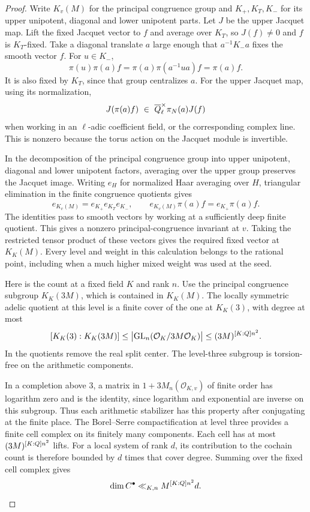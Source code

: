 \begin{proof}
Write \(K_v(M)\) for the principal congruence group and
\(K_+,K_T,K_-\) for its upper unipotent, diagonal and lower
unipotent parts. Let \(J\) be the upper Jacquet map. Lift the
fixed Jacquet vector to \(f\) and average over \(K_T\), so
\(J(f)\ne0\) and \(f\) is \(K_T\)-fixed. Take a diagonal translate \(a\) large enough that \(a^{-1}K_-a\) fixes the smooth vector \(f\). For \(u\in K_-\),
\[
 \pi(u)\pi(a)f=\pi(a)\pi(a^{-1}ua)f=\pi(a)f.
\]
It is also fixed by \(K_T\), since that group centralizes \(a\).
For the upper Jacquet map, using its normalization,
\[
                J(\pi(a)f)\ \in\ \overline{Q}_\ell^\times
                                      \pi_{N}(a)J(f)
\]
when working in an \(\ell\)-adic coefficient field, or the
corresponding complex line. This is nonzero because the torus
action on the Jacquet module is invertible.

In the decomposition of the principal
congruence group into upper unipotent, diagonal and lower
unipotent factors, averaging over the upper group preserves
the Jacquet image. Writing \(e_H\) for normalized Haar averaging over \(H\), triangular elimination in the finite congruence quotients gives
\[
 e_{K_v(M)}=e_{K_+}e_{K_T}e_{K_-},\qquad
 e_{K_v(M)}\pi(a)f=e_{K_+}\pi(a)f .
\]
The identities pass to smooth vectors by working at a sufficiently deep finite quotient.
This gives a nonzero principal-congruence invariant at \(v\).
Taking the restricted tensor product of these vectors gives
the required fixed vector at \(K_K(M)\). Every level and
weight in this calculation belongs to the rational point,
including when a much higher mixed weight was used at the seed.
\label{cor:ordinary-symplectic-cohomology-18}

Here is the count at a fixed field \(K\) and rank \(n\).
Use the principal congruence subgroup \(K_K(3M)\), which is
contained in \(K_K(M)\). The locally symmetric adelic
quotient at this level is a finite cover of the one at
\(K_K(3)\), with degree at most
\[
   [K_K(3):K_K(3M)]
      \le \big|\mathrm{GL}_n(\mathcal O_K/3M\mathcal O_K)\big|
      \le (3M)^{[K:Q]n^2}.
\]
In the quotients remove the real split center. The level-three
subgroup is torsion-free on the arithmetic components.

In a
completion above \(3\), a matrix in \(1+3M_n(\mathcal O_{K,v})\)
of finite order has logarithm zero and is the identity,
since logarithm and exponential are inverse on this subgroup.
Thus each arithmetic stabilizer has this property after
conjugating at the finite place. The Borel--Serre compactification
at level three provides a finite cell complex on its finitely many
components. Each cell has at most \((3M)^{[K:Q]n^2}\) lifts. For a
local system of rank \(d\), its contribution to the cochain count
is therefore bounded by \(d\) times that cover degree. Summing
over the fixed cell complex gives
\[
        \dim C^\bullet\ll_{K,n} M^{[K:Q]n^2}d .
\]
\hfill\mbox{\cite{borel-serre}}


\end{proof}
